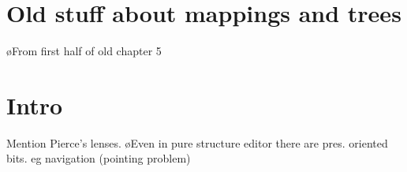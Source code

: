 
%
%
%
%




%																
%																
%																
\section{Old stuff about mappings and trees}

\bl
\o From first half of old chapter 5
\el



%																
%																
%																
\section{Intro}

Mention Pierce's lenses.
\bl
\o Even in pure structure editor there are pres. oriented bits. eg navigation (pointing problem)
\el

